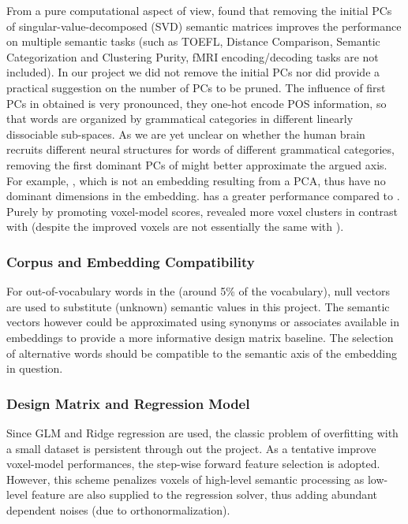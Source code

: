 From a pure computational aspect of view, \textcite{bullinariaExtractingSemanticRepresentations2012} found that removing the initial PCs of singular-value-decomposed (SVD) semantic matrices improves the performance on multiple semantic tasks (such as TOEFL, Distance Comparison, Semantic Categorization and Clustering Purity, fMRI encoding/decoding tasks are not included). In our project we did not remove the initial PCs nor did \citeauthor{bullinariaExtractingSemanticRepresentations2012} provide a practical suggestion on the number of PCs to be pruned. The influence of first PCs in obtained  is very pronounced, they one-hot encode POS information, so that words are organized by grammatical categories in different linearly dissociable sub-spaces. As we are yet unclear on whether the human brain recruits different neural structures for words of different grammatical categories, removing the first dominant PCs of  might better approximate the argued \similarity axis. For example, , which is not an embedding resulting from a PCA, thus have no dominant dimensions in the embedding.  has a greater performance compared to . Purely by promoting voxel-model scores,  revealed more voxel clusters in contrast with  (despite the improved voxels are not essentially the same with ).

\subsubsection{Corpus and Embedding Compatibility}

For out-of-vocabulary words in the  (around 5\% of the vocabulary), null vectors are used to substitute (unknown) semantic values in this project. The semantic vectors however could be approximated using synonyms or associates available in embeddings to provide a more informative design matrix baseline. The selection of alternative words should be compatible to the semantic axis of the embedding in question.

\subsubsection{Design Matrix and Regression Model} 

Since GLM and Ridge regression are used, the classic problem of overfitting with a small dataset is persistent through out the project. As a tentative improve voxel-model performances, the step-wise forward feature selection is adopted. However, this scheme penalizes voxels of high-level semantic processing as low-level feature are also supplied to the regression solver, thus adding abundant dependent noises (due to orthonormalization). 

